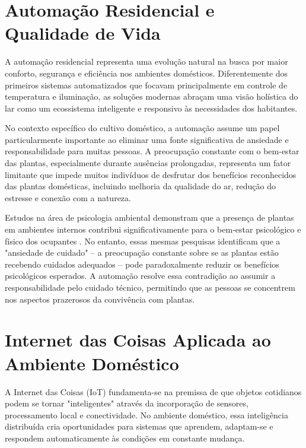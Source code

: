 \documentclass[twoside,english,brazilian]{UNISINOSmonografia}
\begin{document}
\section{Automação Residencial e Qualidade de Vida}

A automação residencial representa uma evolução natural na busca por maior conforto, segurança e eficiência nos ambientes domésticos. Diferentemente dos primeiros sistemas automatizados que focavam principalmente em controle de temperatura e iluminação, as soluções modernas abraçam uma visão holística do lar como um ecossistema inteligente e responsivo às necessidades dos habitantes.

No contexto específico do cultivo doméstico, a automação assume um papel particularmente importante ao eliminar uma fonte significativa de ansiedade e responsabilidade para muitas pessoas. A preocupação constante com o bem-estar das plantas, especialmente durante ausências prolongadas, representa um fator limitante que impede muitos indivíduos de desfrutar dos benefícios reconhecidos das plantas domésticas, incluindo melhoria da qualidade do ar, redução do estresse e conexão com a natureza.

Estudos na área de psicologia ambiental demonstram que a presença de plantas em ambientes internos contribui significativamente para o bem-estar psicológico e físico dos ocupantes \cite{silva2019}. No entanto, essas mesmas pesquisas identificam que a "ansiedade de cuidado" – a preocupação constante sobre se as plantas estão recebendo cuidados adequados – pode paradoxalmente reduzir os benefícios psicológicos esperados. A automação resolve essa contradição ao assumir a responsabilidade pelo cuidado técnico, permitindo que as pessoas se concentrem nos aspectos prazerosos da convivência com plantas.


\section{Internet das Coisas Aplicada ao Ambiente Doméstico}

A Internet das Coisas (IoT) fundamenta-se na premissa de que objetos cotidianos podem se tornar "inteligentes" através da incorporação de sensores, processamento local e conectividade. No ambiente doméstico, essa inteligência distribuída cria oportunidades para sistemas que aprendem, adaptam-se e respondem automaticamente às condições em constante mudança.
\end{document}
